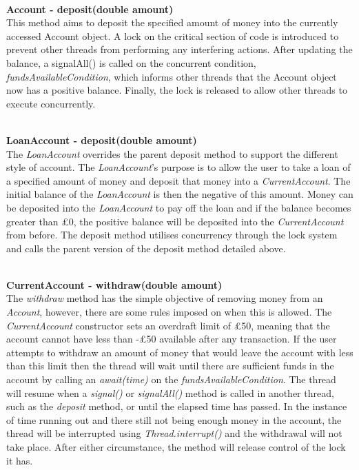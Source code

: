 \documentclass[a4paper,12pt]{article}
\begin{document}
\textbf{\\Account - deposit(double amount)}
\\This method aims to deposit the specified amount of money into the currently accessed Account object. A lock on the critical section of code is introduced to prevent other threads from performing any interfering actions. After updating the balance, a signalAll() is called on the  concurrent condition, \textit{fundsAvailableCondition}, which informs other threads that the Account object now has a positive balance. Finally, the lock is released to allow other threads to execute concurrently.

\textbf{\\LoanAccount - deposit(double amount)}
\\The \textit{LoanAccount} overrides the parent deposit method to support the different style of account. The \textit{LoanAccount}'s purpose is to allow the user to take a loan of a specified amount of money and deposit that money into a \textit{CurrentAccount}. The initial balance of the \textit{LoanAccount} is then the negative of this amount. Money can be deposited into the \textit{LoanAccount} to pay off the loan and if the balance becomes greater than £0, the positive balance will be deposited into the \textit{CurrentAccount} from before. The deposit method utilises concurrency through the lock system and calls the parent version of the deposit method detailed above.  


\textbf{\\CurrentAccount - withdraw(double amount)}
\\The \textit{withdraw} method has the simple objective of removing money from an \textit{Account}, however, there are some rules imposed on when this is allowed. The \textit{CurrentAccount} constructor sets an overdraft limit of £50, meaning that the account cannot have less than -£50 available after any transaction. If the user attempts to withdraw an amount of money that would leave the account with less than this limit then the thread will wait until there are sufficient funds in the account by calling an \textit{await(time)} on the \textit{fundsAvailableCondition}. The thread will resume when a \textit{signal()} or\textit{ signalAll()} method is called in another thread, such as the \textit{deposit} method, or until the elapsed time has passed. In the instance of time running out and there still not being enough money in the account, the thread will be interrupted using \textit{Thread.interrupt()} and the withdrawal will not take place. After either circumstance, the method will release control of the lock it has.
\end{document}
